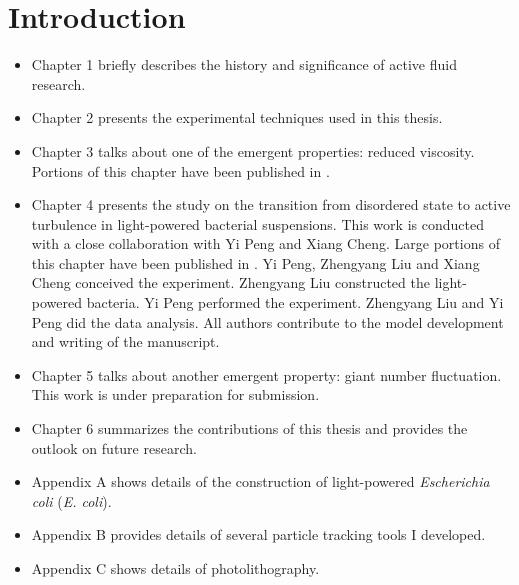 



\chapter{Introduction}
\label{intro_chapter}

\begin{itemize}

\item Chapter 1 briefly describes the history and significance of active fluid research.

\item Chapter 2 presents the experimental techniques used in this thesis.

\item Chapter 3 talks about one of the emergent properties: reduced viscosity. Portions of this chapter have been published in \cite{Liu2019}.

\item Chapter 4 presents the study on the transition from disordered state to active turbulence in light-powered bacterial suspensions. This work is conducted with a close collaboration with Yi Peng and Xiang Cheng. Large portions of this chapter have been published in \cite{Peng2020}. Yi Peng, Zhengyang Liu and Xiang Cheng conceived the experiment. Zhengyang Liu constructed the light-powered bacteria. Yi Peng performed the experiment. Zhengyang Liu and Yi Peng did the data analysis. All authors contribute to the model development and writing of the manuscript.

\item Chapter 5 talks about another emergent property: giant number fluctuation. This work is under preparation for submission.

\item Chapter 6 summarizes the contributions of this thesis and provides the outlook on future research.

\item Appendix A shows details of the construction of light-powered \textit{Escherichia coli} (\textit{E. coli}).

\item Appendix B provides details of several particle tracking tools I developed.

\item Appendix C shows details of photolithography.

\end{itemize}


